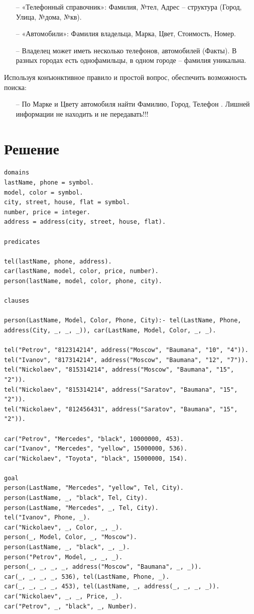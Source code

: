 \documentclass[12pt]{report}
\begin{document}
\begin{itemize}
    \item[--] «Телефонный справочник»: Фамилия, №тел, Адрес – структура (Город, Улица, №дома,
    №кв).
    \item[--] «Автомобили»: Фамилия владельца, Марка, Цвет, Стоимость, Номер.
    \item[--] Владелец может иметь несколько телефонов, автомобилей (Факты). В разных городах есть однофамильцы, в одном городе – фамилия уникальна.
\end{itemize}

Используя конъюнктивное правило и простой вопрос, обеспечить возможность поиска:

\begin{itemize}
	\item[--] По Марке и Цвету автомобиля найти Фамилию, Город, Телефон . Лишней информации не находить и не передавать!!!
\end{itemize}

\chapter*{Решение}
\begin{lstlisting}
domains
lastName, phone = symbol.
model, color = symbol.
city, street, house, flat = symbol.
number, price = integer.
address = address(city, street, house, flat).

predicates

tel(lastName, phone, address).
car(lastName, model, color, price, number).
person(lastName, model, color, phone, city).

clauses

person(LastName, Model, Color, Phone, City):- tel(LastName, Phone, address(City, _, _, _)), car(LastName, Model, Color, _, _).

tel("Petrov", "812314214", address("Moscow", "Baumana", "10", "4")).
tel("Ivanov", "817314214", address("Moscow", "Baumana", "12", "7")).
tel("Nickolaev", "815314214", address("Moscow", "Baumana", "15", "2")).
tel("Nickolaev", "815314214", address("Saratov", "Baumana", "15", "2")).
tel("Nickolaev", "812456431", address("Saratov", "Baumana", "15", "2")).

car("Petrov", "Mercedes", "black", 10000000, 453).
car("Ivanov", "Mercedes", "yellow", 15000000, 536).
car("Nickolaev", "Toyota", "black", 15000000, 154).

goal
person(LastName, "Mercedes", "yellow", Tel, City).
person(LastName, _, "black", Tel, City).
person(LastName, "Mercedes", _, Tel, City).
tel("Ivanov", Phone, _).
car("Nickolaev", _, Color, _, _).
person(_, Model, Color, _, "Moscow").
person(LastName, _, "black", _, _).
person("Petrov", Model, _, _, _).
person(_, _, _, _, address("Moscow", "Baumana", _, _)).
car(_, _, _, _, 536), tel(LastName, Phone, _).
car(_, _, _, _, 453), tel(LastName, _, address(_, _, _, _)).
car("Nickolaev", _, _, Price, _).
car("Petrov", _, "black", _, Number).
\end{lstlisting}
\end{document}
